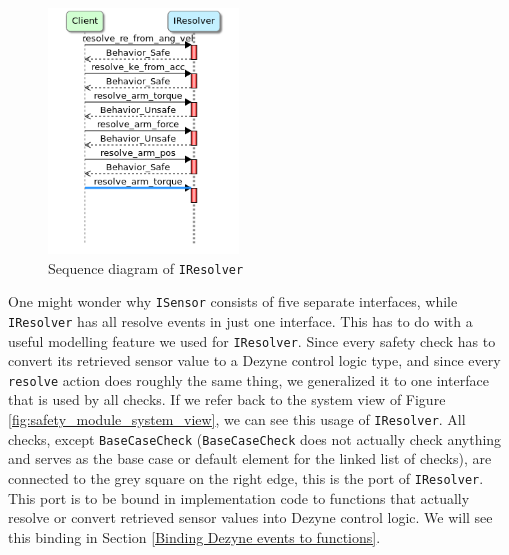 \documentclass[12pt]{scrreprt}
\begin{document}
\begin{figure}[H]
    \centering
    \includegraphics[width=0.45\textwidth]{Figures/results/modelling_figures/IResolver/IResolver_seq.png}
    \caption{Sequence diagram of \texttt{IResolver}}
    \label{fig:IResolver_seq}
\end{figure}

One might wonder why \texttt{ISensor} consists of five separate interfaces, while \texttt{IResolver} has all resolve events in just one interface. This has to do with a useful modelling feature we used for \texttt{IResolver}. Since every safety check has to convert its retrieved sensor value to a Dezyne control logic type, and since every \texttt{resolve} action does roughly the same thing, we generalized it to one interface that is used by all checks. If we refer back to the system view of Figure \ref{fig:safety_module_system_view}, we can see this usage of \texttt{IResolver}. All checks, except \texttt{BaseCaseCheck} (\texttt{BaseCaseCheck} does not actually check anything and serves as the base case or default element for the linked list of checks), are connected to the grey square on the right edge, this is the port of \texttt{IResolver}. This port is to be bound in implementation code to functions that actually resolve or convert retrieved sensor values into Dezyne control logic. We will see this binding in Section \ref{Binding Dezyne events to functions}.
\end{document}

